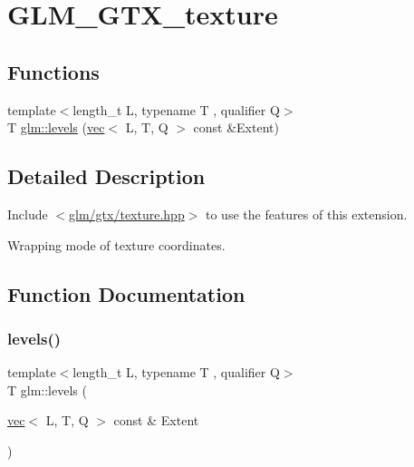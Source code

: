 \hypertarget{group__gtx__texture}{}\section{G\+L\+M\+\_\+\+G\+T\+X\+\_\+texture}
\label{group__gtx__texture}
\subsection*{Functions}
\begin{DoxyCompactItemize}
\item 
{\footnotesize template$<$length\+\_\+t L, typename T , qualifier Q$>$ }\\T \hyperlink{group__gtx__texture_gaa8c377f4e63486db4fa872d77880da73}{glm\+::levels} (\hyperlink{structglm_1_1vec}{vec}$<$ L, T, Q $>$ const \&Extent)
\end{DoxyCompactItemize}


\subsection{Detailed Description}
Include $<$\hyperlink{texture_8hpp}{glm/gtx/texture.\+hpp}$>$ to use the features of this extension.

Wrapping mode of texture coordinates. 

\subsection{Function Documentation}
\mbox{\label{group__gtx__texture_gaa8c377f4e63486db4fa872d77880da73}} 
\subsubsection{\texorpdfstring{levels()}{levels()}}
{\footnotesize\ttfamily template$<$length\+\_\+t L, typename T , qualifier Q$>$ \\
T glm\+::levels (\begin{DoxyParamCaption}\item[{\hyperlink{structglm_1_1vec}{vec}$<$ L, T, Q $>$ const \&}]{Extent }\end{DoxyParamCaption})\hspace{0.3cm}{\ttfamily [inline]}}

